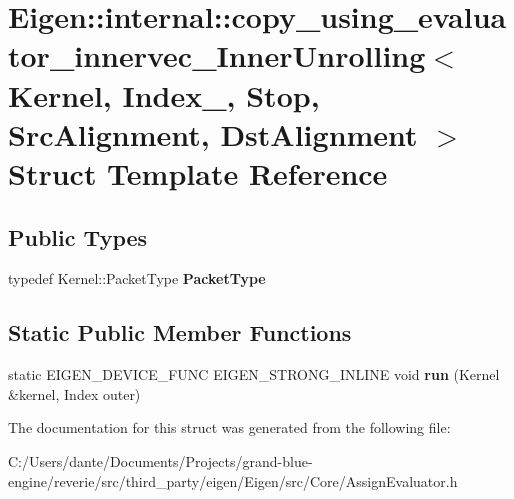 \hypertarget{struct_eigen_1_1internal_1_1copy__using__evaluator__innervec___inner_unrolling}{}\section{Eigen\+::internal\+::copy\+\_\+using\+\_\+evaluator\+\_\+innervec\+\_\+\+Inner\+Unrolling$<$ Kernel, Index\+\_\+, Stop, Src\+Alignment, Dst\+Alignment $>$ Struct Template Reference}
\label{struct_eigen_1_1internal_1_1copy__using__evaluator__innervec___inner_unrolling}
\subsection*{Public Types}
\begin{DoxyCompactItemize}
\item 
\mbox{\label{struct_eigen_1_1internal_1_1copy__using__evaluator__innervec___inner_unrolling_a7bd34f0aaff97549c85930302f539eef}} 
typedef Kernel\+::\+Packet\+Type {\bfseries Packet\+Type}
\end{DoxyCompactItemize}
\subsection*{Static Public Member Functions}
\begin{DoxyCompactItemize}
\item 
\mbox{\label{struct_eigen_1_1internal_1_1copy__using__evaluator__innervec___inner_unrolling_a50b1b52b49e7474bb4b6d77bb0286c2d}} 
static E\+I\+G\+E\+N\+\_\+\+D\+E\+V\+I\+C\+E\+\_\+\+F\+U\+NC E\+I\+G\+E\+N\+\_\+\+S\+T\+R\+O\+N\+G\+\_\+\+I\+N\+L\+I\+NE void {\bfseries run} (Kernel \&kernel, Index outer)
\end{DoxyCompactItemize}


The documentation for this struct was generated from the following file\+:\begin{DoxyCompactItemize}
\item 
C\+:/\+Users/dante/\+Documents/\+Projects/grand-\/blue-\/engine/reverie/src/third\+\_\+party/eigen/\+Eigen/src/\+Core/Assign\+Evaluator.\+h\end{DoxyCompactItemize}
